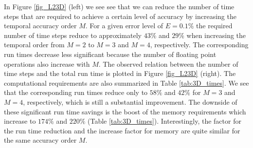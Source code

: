 \documentclass[11pt,onecolumn,oneside]{article}
\begin{document}
In Figure \ref{fig_L23D} (left)  we see see that we can reduce the number of time steps that are required to achieve a certain level of accuracy by increasing the temporal accuracy order $M$. For a given error level of $E=0.1\%$ the required number of  time steps reduce to approximately $43\%$ and $29\%$ when increasing the temporal order from $M=2$ to  $M=3$ and $M=4$, respectively. The corresponding run times decrease less significant because the number of floating point operations also increase with $M$. The observed relation between the number of time steps and the total run time is plotted in Figure  \ref{fig_L23D} (right). The computational requirements are also summarized in Table \ref{tab:3D_times}. We see that the corresponding run times reduce only to $58\%$ and $42\%$ for $M=3$ and $M=4$, respectively, which is still a substantial improvement. The downside of these significant run time savings is the boost of the memory requirements which increase to $174\%$ and $220\%$ (Table \ref{tab:3D_times}). Interestingly, the factor for the run time reduction and the increase factor for memory are quite similar for the same accuracy order $M$. 
\end{document}
